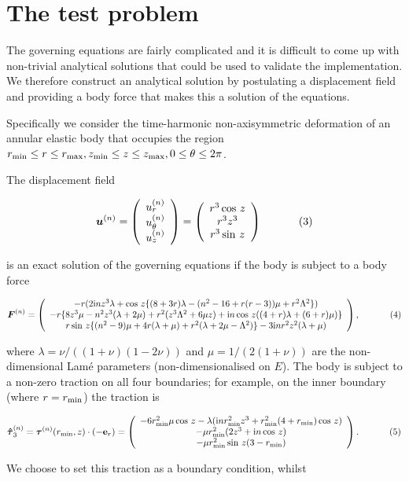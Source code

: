 \hypertarget{index_test}{}\section{The test problem}\label{index_test}
The governing equations are fairly complicated and it is difficult to come up with non-\/trivial analytical solutions that could be used to validate the implementation. We therefore construct an analytical solution by postulating a displacement field and providing a body force that makes this a solution of the equations.

Specifically we consider the time-\/harmonic non-\/axisymmetric deformation of an annular elastic body that occupies the region $ r_{\rm min}\leq r\leq r_{\rm max}, z_{\rm min}\leq z\leq z_{\rm max}, 0\leq\theta\leq 2\pi $.

The displacement field \begin{center} \[ \mbox{\boldmath$u$}^{(n)}= \left(\begin{array}{c}u_r^{(n)}\\u_\theta^{(n)}\\u_z^{(n)}\end{array}\right)= \left(\begin{array}{c}r^3\cos\, z\\r^3z^3\\r^3\sin\,z\end{array}\right) \ \ \ \ \ \ \ \ \ \ (3) \] \end{center}  is an exact solution of the governing equations if the body is subject to a body force \begin{center} \[ \mbox{\boldmath$ F$}^{(n)}=\left(\begin{array}{c} -r(2{\rm i} nz^3\lambda+\cos\, z\{(8+3r)\lambda-(n^2-16+r(r-3))\mu+r^2 \Lambda^2\})\\ -r\{8z^3\mu-n^2z^3(\lambda+2\mu)+r^2(z^3\Lambda^2+6\mu z)+{\rm i} n\cos\, z((4+r)\lambda+(6+r)\mu)\}\\ r\sin\, z\{(n^2-9)\mu+4r(\lambda+\mu)+r^2(\lambda+2\mu-\Lambda^2)\}-3{\rm i} nr^2z^2(\lambda+\mu)\end{array}\right), \ \ \ \ \ \ \ \ \ \ (4) \] \end{center}  where $ \lambda = \nu/((1+\nu)(1-2\nu))$ and $ \mu = 1/(2(1+\nu))$ are the non-\/dimensional Lam\'{e} parameters (non-\/dimensionalised on $ E $). The body is subject to a non-\/zero traction on all four boundaries; for example, on the inner boundary (where $ r=r_{\rm min} $) the traction is \begin{center} \[ \mbox{\boldmath$ \hat{\tau}$}^{(n)}_3= \mbox{\boldmath$ \tau$}^{(n)}(r_{\rm min},z)\cdot (-{\bf e}_r) = \left(\begin{array}{c} -6r_{\rm min}^2\mu\cos\, z-\lambda({\rm i} nr_{\rm min}^2z^3+r_{\rm min}^2(4+r_{\rm min})\cos\, z) \\ -\mu r_{\rm min}^2(2z^3+{\rm i} n\cos\, z) \\ -\mu r_{\rm min}^2\sin\, z(3-r_{\rm min}) \end{array}\right). \ \ \ \ \ \ \ \ \ \ (5) \] \end{center}  We choose to set this traction as a boundary condition, whilst 